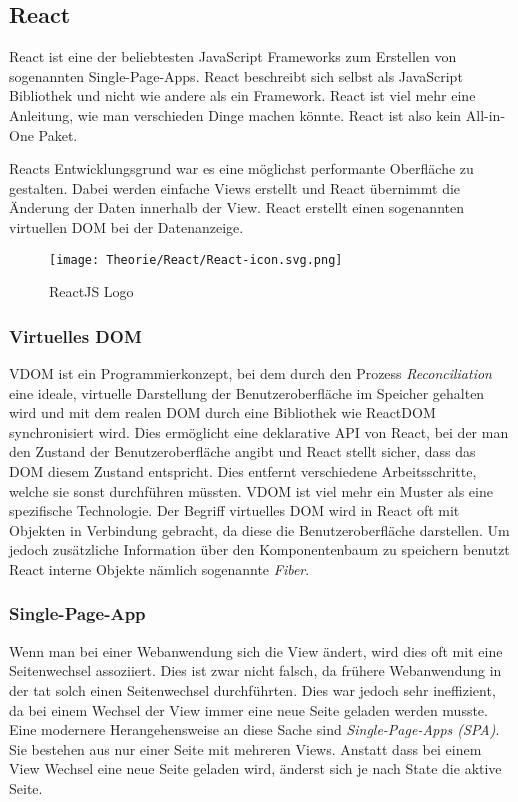 \subsection{React}
\label{reactjs}
React ist eine der beliebtesten JavaScript Frameworks zum Erstellen von sogenannten 
Single-Page-Apps. React beschreibt sich selbst als JavaScript Bibliothek und nicht wie andere als 
ein Framework. React ist viel mehr eine Anleitung, wie man verschieden Dinge machen könnte.
React ist also kein All-in-One Paket.


Reacts Entwicklungsgrund war es eine möglichst performante Oberfläche zu gestalten. Dabei werden 
einfache Views erstellt und React übernimmt die Änderung der Daten innerhalb der View. React 
erstellt einen sogenannten virtuellen DOM bei der Datenanzeige.


\begin{figure}[H]
  \begin{center}
    \texttt{[image: Theorie/React/React-icon.svg.png]}
    \caption{ReactJS Logo~\cite{reactjs}}
  \end{center}
\end{figure}

\subsubsection{Virtuelles DOM}
VDOM ist ein Programmierkonzept, bei dem durch den Prozess \textit{Reconciliation} eine ideale, 
virtuelle Darstellung der Benutzeroberfläche im Speicher gehalten wird und mit dem realen DOM durch 
eine Bibliothek wie ReactDOM synchronisiert wird. Dies ermöglicht eine deklarative API von React, 
bei der man den Zustand der Benutzeroberfläche angibt und React stellt sicher, dass das DOM diesem 
Zustand entspricht. Dies entfernt verschiedene Arbeitsschritte, welche sie sonst durchführen müssten.
VDOM ist viel mehr ein Muster als eine spezifische Technologie. Der Begriff virtuelles DOM wird in 
React oft mit Objekten in Verbindung gebracht, da diese die Benutzeroberfläche darstellen. Um jedoch 
zusätzliche Information über den Komponentenbaum zu speichern benutzt React interne 
Objekte nämlich sogenannte \textit{Fiber}.\cite{DOM}

\subsubsection{Single-Page-App}
\label{singlePageApp}
Wenn man bei einer Webanwendung sich die View ändert, wird dies oft mit eine Seitenwechsel 
assoziiert. Dies ist zwar nicht falsch, da frühere Webanwendung in der tat solch einen Seitenwechsel 
durchführten. Dies war jedoch sehr ineffizient, da bei einem Wechsel der View immer eine neue Seite 
geladen werden musste. Eine modernere Herangehensweise an diese Sache sind 
\textit{Single-Page-Apps (SPA)}. Sie bestehen aus nur einer Seite mit mehreren Views. Anstatt dass 
bei einem View Wechsel eine neue Seite geladen wird, änderst sich je nach State die aktive Seite.
~\cite{SPA}


